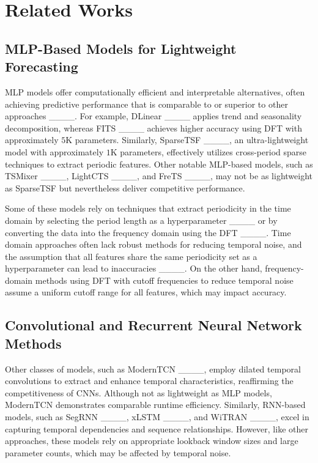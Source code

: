 \section{Related Works}
\label{sec: related works}

\subsection{MLP-Based Models for Lightweight Forecasting} \label{sub sec: related works MLP}
\ac{MLP} models offer computationally efficient and interpretable alternatives, often achieving predictive performance that is comparable to or superior to other approaches ____. For example, DLinear ____ applies trend and seasonality decomposition, whereas FITS ____ achieves higher accuracy using \ac{DFT} with approximately $5$K parameters. Similarly, SparseTSF ____, an ultra-lightweight model with approximately $1$K parameters, effectively utilizes cross-period sparse techniques to extract periodic features. Other notable \ac{MLP}-based models, such as TSMixer ____, LightCTS ____, and FreTS ____, may not be as lightweight as SparseTSF but nevertheless deliver competitive performance. 

Some of these models rely on techniques that extract periodicity in the time domain by selecting the period length as a hyperparameter ____ or by converting the data into the frequency domain using the \ac{DFT} ____. Time domain approaches often lack robust methods for reducing temporal noise, and the assumption that all features share the same periodicity set as a hyperparameter can lead to inaccuracies ____. On the other hand, frequency-domain methods using \ac{DFT} with cutoff frequencies to reduce temporal noise assume a uniform cutoff range for all features, which may impact accuracy.


\subsection{Convolutional and Recurrent Neural Network Methods} \label{sub sec: related works CNN}

Other classes of models, such as ModernTCN ____, employ dilated temporal convolutions to extract and enhance temporal characteristics, reaffirming the competitiveness of \ac{CNN}s. Although not as lightweight as \ac{MLP} models, ModernTCN demonstrates comparable runtime efficiency. Similarly, \ac{RNN}-based models, such as SegRNN ____, xLSTM ____, and WiTRAN ____, excel in capturing temporal dependencies and sequence relationships. However, like other approaches, these models rely on appropriate lookback window sizes and large parameter counts, which may be affected by temporal noise.

